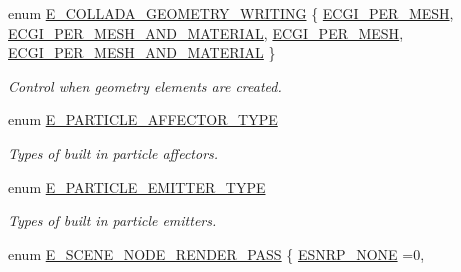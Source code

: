 \begin{DoxyCompactItemize}
\item 
enum \hyperlink{namespaceirr_1_1scene_a179008e7c02889459edf81394dbd6959}{E\+\_\+\+C\+O\+L\+L\+A\+D\+A\+\_\+\+G\+E\+O\+M\+E\+T\+R\+Y\+\_\+\+W\+R\+I\+T\+I\+NG} \{ \hyperlink{namespaceirr_1_1scene_a179008e7c02889459edf81394dbd6959a3e88c7e85ad953d279e36e9e68658ef2}{E\+C\+G\+I\+\_\+\+P\+E\+R\+\_\+\+M\+E\+SH}, 
\hyperlink{namespaceirr_1_1scene_a179008e7c02889459edf81394dbd6959ae673e963bed1f4bea0acbe4c02fe23de}{E\+C\+G\+I\+\_\+\+P\+E\+R\+\_\+\+M\+E\+S\+H\+\_\+\+A\+N\+D\+\_\+\+M\+A\+T\+E\+R\+I\+AL}, 
\hyperlink{namespaceirr_1_1scene_a179008e7c02889459edf81394dbd6959a3e88c7e85ad953d279e36e9e68658ef2}{E\+C\+G\+I\+\_\+\+P\+E\+R\+\_\+\+M\+E\+SH}, 
\hyperlink{namespaceirr_1_1scene_a179008e7c02889459edf81394dbd6959ae673e963bed1f4bea0acbe4c02fe23de}{E\+C\+G\+I\+\_\+\+P\+E\+R\+\_\+\+M\+E\+S\+H\+\_\+\+A\+N\+D\+\_\+\+M\+A\+T\+E\+R\+I\+AL}
 \}\begin{DoxyCompactList}\small\item\em Control when geometry elements are created. \end{DoxyCompactList}
\item 
\mbox{\label{namespaceirr_1_1scene_a34c0f9475cfcbda8b50ad816a046010b}} 
enum \hyperlink{namespaceirr_1_1scene_a34c0f9475cfcbda8b50ad816a046010b}{E\+\_\+\+P\+A\+R\+T\+I\+C\+L\+E\+\_\+\+A\+F\+F\+E\+C\+T\+O\+R\+\_\+\+T\+Y\+PE} \begin{DoxyCompactList}\small\item\em Types of built in particle affectors. \end{DoxyCompactList}
\item 
\mbox{\label{namespaceirr_1_1scene_a3e251a881c886884a78adea2e546272b}} 
enum \hyperlink{namespaceirr_1_1scene_a3e251a881c886884a78adea2e546272b}{E\+\_\+\+P\+A\+R\+T\+I\+C\+L\+E\+\_\+\+E\+M\+I\+T\+T\+E\+R\+\_\+\+T\+Y\+PE} \begin{DoxyCompactList}\small\item\em Types of built in particle emitters. \end{DoxyCompactList}
\item 
enum \hyperlink{namespaceirr_1_1scene_a7862269bd1abc123929d4dbb8200d67f}{E\+\_\+\+S\+C\+E\+N\+E\+\_\+\+N\+O\+D\+E\+\_\+\+R\+E\+N\+D\+E\+R\+\_\+\+P\+A\+SS} \{ \newline
\hyperlink{namespaceirr_1_1scene_a7862269bd1abc123929d4dbb8200d67fa5649aed501080ff0b79e409b55a9926f}{E\+S\+N\+R\+P\+\_\+\+N\+O\+NE} =0, 

\end{DoxyCompactItemize}

